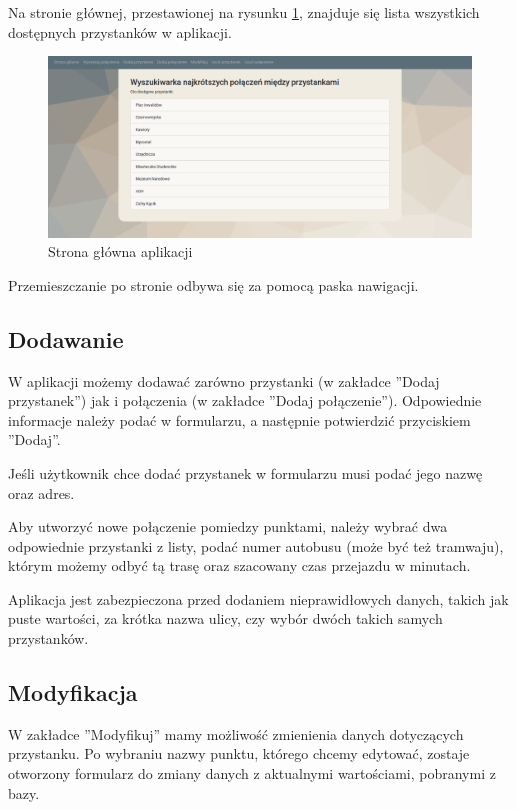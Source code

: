 \documentclass[12pt]{article}
\begin{document}
Na stronie głównej, przestawionej na rysunku \ref{fig:rys1}, znajduje się lista wszystkich dostępnych przystanków w aplikacji.

\begin{figure}[h]
\begin{center}
\includegraphics[width=14cm]{strona.png} 
\caption{Strona główna aplikacji} \label{fig:rys1}
\end{center}
\end{figure}

Przemieszczanie po stronie odbywa się za pomocą paska nawigacji.

\subsection{Dodawanie}
W aplikacji możemy dodawać zarówno przystanki (w zakładce ''Dodaj przystanek'') jak i połączenia (w zakładce ''Dodaj połączenie''). Odpowiednie informacje należy podać w formularzu, a następnie potwierdzić przyciskiem ''Dodaj''.

Jeśli użytkownik chce dodać przystanek w formularzu musi podać jego nazwę oraz adres. 

Aby utworzyć nowe połączenie pomiedzy punktami, należy wybrać dwa odpowiednie przystanki z listy, podać numer autobusu (może być też tramwaju), którym możemy odbyć tą trasę oraz szacowany czas przejazdu w minutach.

Aplikacja jest zabezpieczona przed dodaniem nieprawidłowych danych, takich jak puste wartości, za krótka nazwa ulicy, czy wybór dwóch takich samych przystanków.

\subsection{Modyfikacja}
W zakładce ''Modyfikuj'' mamy możliwość zmienienia danych dotyczących przystanku. Po wybraniu nazwy punktu, którego chcemy edytować, zostaje otworzony formularz do zmiany danych z aktualnymi wartościami, pobranymi z bazy.
\end{document}
